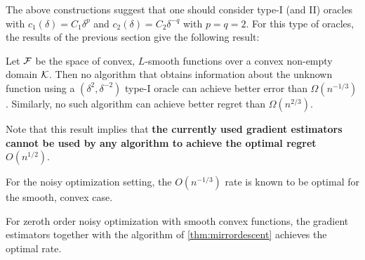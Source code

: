 The above constructions suggest that one should consider type-I (and II) oracles with $c_1(\delta) = C_1 \delta^p$ and $c_2(\delta) = C_2\delta^{-q}$ with $p=q=2$.
For this type of oracles, the results of the previous section give the following result: 
\begin{theorem}
Let $\mathcal{F}$ be the space of convex, $L$-smooth functions over a convex non-empty domain $\mathcal{K}$.
Then no algorithm that obtains information about the unknown function using a 
$(\delta^2,\delta^{-2})$ type-I oracle
 can achieve better error than $\Omega(n^{-1/3})$.
Similarly, no such algorithm can achieve better regret than $\Omega(n^{2/3})$.
\end{theorem}
\begin{remark}
Note that this result implies that \textbf{
the currently used gradient estimators cannot be used by any algorithm to achieve the optimal
regret $O(n^{1/2})$}.  
\end{remark}
For the noisy optimization setting, the $O(n^{-1/3})$ rate is known to be optimal for the smooth, convex case.
\begin{theorem}
For zeroth order noisy optimization with smooth convex functions, the gradient estimators together with the algorithm of \cref{thm:mirrordescent} achieves the optimal rate. 
\end{theorem}


